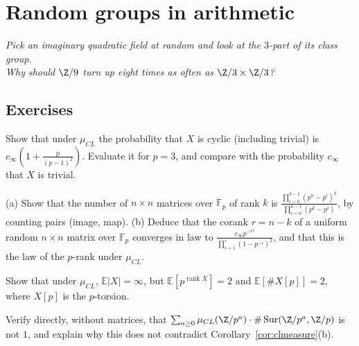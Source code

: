 \chapter{Random groups in arithmetic}\label{ch:oc-classgroups}\label{ch:cohenlenstra}

\begin{center}\itshape
Pick an imaginary quadratic field at random and look at the $3$-part of its class group.\\
Why should $\Z/9$ turn up eight times as often as $\Z/3\times\Z/3$?
\end{center}





\section{Exercises}

\begin{exercise}[$\star$]\label{ex:clcyclic}
Show that under $\mu_{CL}$ the probability that $X$ is cyclic (including trivial) is $c_\infty(1+\frac p{(p-1)^2})$. Evaluate it for $p=3$, and compare with the probability $c_\infty$ that $X$ is trivial.
\end{exercise}

\begin{exercise}[$\star\star$]\label{ex:clrank}
(a) Show that the number of $n\times n$ matrices over $\mathbb F_p$ of rank $k$ is $\frac{\prod_{i=0}^{k-1}(p^n-p^i)^2}{\prod_{i=0}^{k-1}(p^k-p^i)}$, by counting pairs (image, map). (b) Deduce that the corank $r=n-k$ of a uniform random $n\times n$ matrix over $\mathbb F_p$ converges in law to $\frac{c_\infty p^{-r^2}}{\prod_{i=1}^r(1-p^{-i})^2}$, and that this is the law of the $p$-rank under $\mu_{CL}$.
\end{exercise}

\begin{exercise}[$\star$]\label{ex:clmean}
Show that under $\mu_{CL}$, $\mathbb E|X|=\infty$, but $\mathbb E[p^{\operatorname{rank}X}]=2$ and $\mathbb E[\#X[p]]=2$, where $X[p]$ is the $p$-torsion.
\end{exercise}

\begin{exercise}[$\star\star$]\label{ex:clsur}
Verify directly, without matrices, that $\sum_{a\ge0}\mu_{CL}(\Z/p^a)\cdot\#\operatorname{Sur}(\Z/p^a,\Z/p)$ is not $1$, and explain why this does not contradict Corollary~\ref{cor:clmeasure}(b).
\end{exercise}

